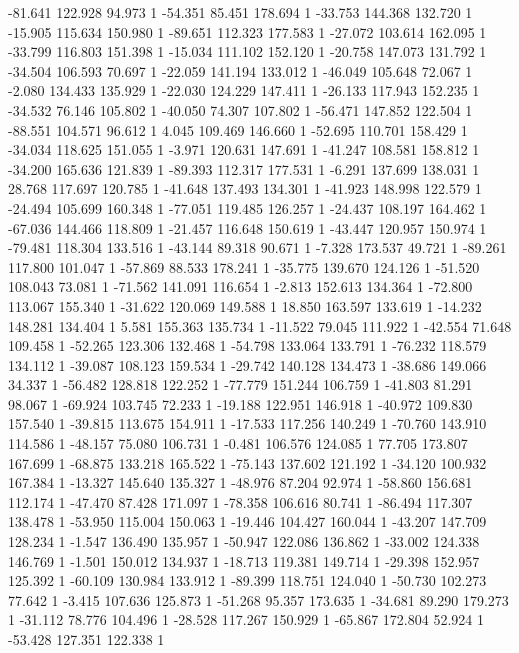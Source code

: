 	-81.641 122.928 94.973 1
	-54.351 85.451 178.694 1
	-33.753 144.368 132.720 1
	-15.905 115.634 150.980 1
	-89.651 112.323 177.583 1
	-27.072 103.614 162.095 1
	-33.799 116.803 151.398 1
	-15.034 111.102 152.120 1
	-20.758 147.073 131.792 1
	-34.504 106.593 70.697 1
	-22.059 141.194 133.012 1
	-46.049 105.648 72.067 1
	-2.080 134.433 135.929 1
	-22.030 124.229 147.411 1
	-26.133 117.943 152.235 1
	-34.532 76.146 105.802 1
	-40.050 74.307 107.802 1
	-56.471 147.852 122.504 1
	-88.551 104.571 96.612 1
	4.045 109.469 146.660 1
	-52.695 110.701 158.429 1
	-34.034 118.625 151.055 1
	-3.971 120.631 147.691 1
	-41.247 108.581 158.812 1
	-34.200 165.636 121.839 1
	-89.393 112.317 177.531 1
	-6.291 137.699 138.031 1
	28.768 117.697 120.785 1
	-41.648 137.493 134.301 1
	-41.923 148.998 122.579 1
	-24.494 105.699 160.348 1
	-77.051 119.485 126.257 1
	-24.437 108.197 164.462 1
	-67.036 144.466 118.809 1
	-21.457 116.648 150.619 1
	-43.447 120.957 150.974 1
	-79.481 118.304 133.516 1
	-43.144 89.318 90.671 1
	-7.328 173.537 49.721 1
	-89.261 117.800 101.047 1
	-57.869 88.533 178.241 1
	-35.775 139.670 124.126 1
	-51.520 108.043 73.081 1
	-71.562 141.091 116.654 1
	-2.813 152.613 134.364 1
	-72.800 113.067 155.340 1
	-31.622 120.069 149.588 1
	18.850 163.597 133.619 1
	-14.232 148.281 134.404 1
	5.581 155.363 135.734 1
	-11.522 79.045 111.922 1
	-42.554 71.648 109.458 1
	-52.265 123.306 132.468 1
	-54.798 133.064 133.791 1
	-76.232 118.579 134.112 1
	-39.087 108.123 159.534 1
	-29.742 140.128 134.473 1
	-38.686 149.066 34.337 1
	-56.482 128.818 122.252 1
	-77.779 151.244 106.759 1
	-41.803 81.291 98.067 1
	-69.924 103.745 72.233 1
	-19.188 122.951 146.918 1
	-40.972 109.830 157.540 1
	-39.815 113.675 154.911 1
	-17.533 117.256 140.249 1
	-70.760 143.910 114.586 1
	-48.157 75.080 106.731 1
	-0.481 106.576 124.085 1
	77.705 173.807 167.699 1
	-68.875 133.218 165.522 1
	-75.143 137.602 121.192 1
	-34.120 100.932 167.384 1
	-13.327 145.640 135.327 1
	-48.976 87.204 92.974 1
	-58.860 156.681 112.174 1
	-47.470 87.428 171.097 1
	-78.358 106.616 80.741 1
	-86.494 117.307 138.478 1
	-53.950 115.004 150.063 1
	-19.446 104.427 160.044 1
	-43.207 147.709 128.234 1
	-1.547 136.490 135.957 1
	-50.947 122.086 136.862 1
	-33.002 124.338 146.769 1
	-1.501 150.012 134.937 1
	-18.713 119.381 149.714 1
	-29.398 152.957 125.392 1
	-60.109 130.984 133.912 1
	-89.399 118.751 124.040 1
	-50.730 102.273 77.642 1
	-3.415 107.636 125.873 1
	-51.268 95.357 173.635 1
	-34.681 89.290 179.273 1
	-31.112 78.776 104.496 1
	-28.528 117.267 150.929 1
	-65.867 172.804 52.924 1
	-53.428 127.351 122.338 1
